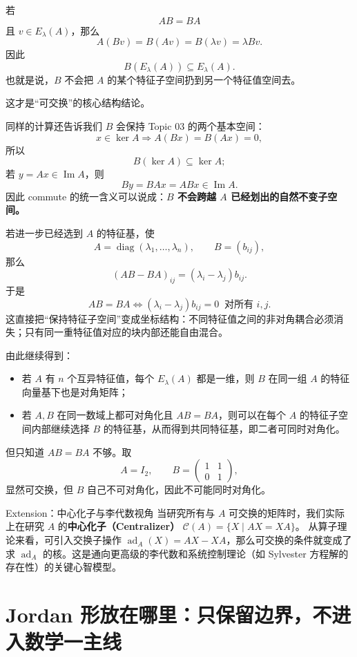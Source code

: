 \documentclass[11pt,a4paper]{ctexart}
\newcommand{\kw}[1]{\textbf{\color{deep}#1}}
\begin{document}
若
\[
AB=BA
\]
且 $v\in E_\lambda(A)$，那么
\[
A(Bv)=B(Av)=B(\lambda v)=\lambda Bv.
\]
因此
\[
\boxed{B(E_\lambda(A))\subseteq E_\lambda(A).}
\]
也就是说，$B$ 不会把 $A$ 的某个特征子空间扔到另一个特征值空间去。

这才是“可交换”的核心结构结论。

同样的计算还告诉我们 $B$ 会保持 Topic 03 的两个基本空间：
\[
x\in\ker A
\Rightarrow
A(Bx)=B(Ax)=0,
\]
所以
\[
B(\ker A)\subseteq\ker A;
\]
若 $y=Ax\in\operatorname{Im}A$，则
\[
By=BAx=ABx\in\operatorname{Im}A.
\]
因此 commute 的统一含义可以说成：\kw{$B$ 不会跨越 $A$ 已经划出的自然不变子空间。}

若进一步已经选到 $A$ 的特征基，使
\[
A=\operatorname{diag}(\lambda_1,\dots,\lambda_n),
\qquad B=(b_{ij}),
\]
那么
\[
(AB-BA)_{ij}=(\lambda_i-\lambda_j)b_{ij}.
\]
于是
\[
\boxed{AB=BA\iff(\lambda_i-\lambda_j)b_{ij}=0\ \text{ 对所有 }i,j.}
\]
这直接把“保持特征子空间”变成坐标结构：不同特征值之间的非对角耦合必须消失；只有同一重特征值对应的块内部还能自由混合。

由此继续得到：
\begin{itemize}
  \item 若 $A$ 有 $n$ 个互异特征值，每个 $E_\lambda(A)$ 都是一维，则 $B$ 在同一组 $A$ 的特征向量基下也是对角矩阵；
  \item 若 $A,B$ 在同一数域上都可对角化且 $AB=BA$，则可以在每个 $A$ 的特征子空间内部继续选择 $B$ 的特征基，从而得到共同特征基，即二者可同时对角化。
\end{itemize}

但只知道 $AB=BA$ 不够。取
\[
A=I_2,
\qquad
B=\begin{pmatrix}1&1\\0&1\end{pmatrix},
\]
显然可交换，但 $B$ 自己不可对角化，因此不可能同时对角化。

\begin{corebox}{Extension：中心化子与李代数视角}
当研究所有与 $A$ 可交换的矩阵时，我们实际上在研究 $A$ 的\kw{中心化子（Centralizer）} $\mathcal{C}(A) = \{X \mid AX = XA\}$。
从算子理论来看，可引入交换子操作 $\operatorname{ad}_A(X) = AX - XA$，那么可交换的条件就变成了求 $\operatorname{ad}_A$ 的核。这是通向更高级的李代数和系统控制理论（如 Sylvester 方程解的存在性）的关键心智模型。
\end{corebox}

\section{Jordan 形放在哪里：只保留边界，不进入数学一主线}
\end{document}
